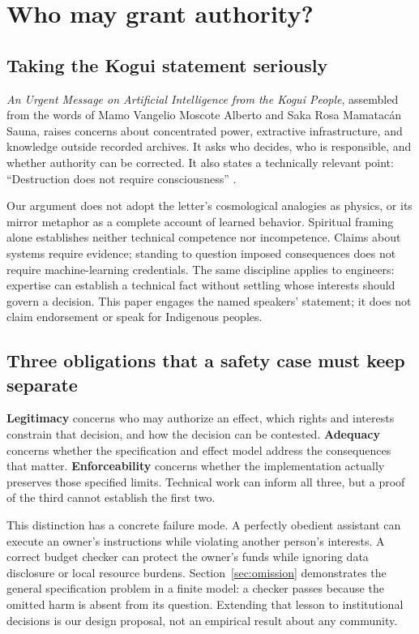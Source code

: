 \section{Who may grant authority?}
\label{sec:legitimacy}

\subsection{Taking the Kogui statement seriously}
\emph{An Urgent Message on Artificial Intelligence from the Kogui People}, assembled from the words of Mamo Vangelio Moscote Alberto and Saka Rosa Mamatac\'an Sauna, raises concerns about concentrated power, extractive infrastructure, and knowledge outside recorded archives. It asks who decides, who is responsible, and whether authority can be corrected. It also states a technically relevant point: ``Destruction does not require consciousness'' \cite[pp.~1--4, 10--14]{kogui}.

Our argument does not adopt the letter's cosmological analogies as physics, or its mirror metaphor as a complete account of learned behavior. Spiritual framing alone establishes neither technical competence nor incompetence. Claims about systems require evidence; standing to question imposed consequences does not require machine-learning credentials. The same discipline applies to engineers: expertise can establish a technical fact without settling whose interests should govern a decision. This paper engages the named speakers' statement; it does not claim endorsement or speak for Indigenous peoples.

\subsection{Three obligations that a safety case must keep separate}
\textbf{Legitimacy} concerns who may authorize an effect, which rights and interests constrain that decision, and how the decision can be contested. \textbf{Adequacy} concerns whether the specification and effect model address the consequences that matter. \textbf{Enforceability} concerns whether the implementation actually preserves those specified limits. Technical work can inform all three, but a proof of the third cannot establish the first two.

This distinction has a concrete failure mode. A perfectly obedient assistant can execute an owner's instructions while violating another person's interests. A correct budget checker can protect the owner's funds while ignoring data disclosure or local resource burdens. Section~\ref{sec:omission} demonstrates the general specification problem in a finite model: a checker passes because the omitted harm is absent from its question. Extending that lesson to institutional decisions is our design proposal, not an empirical result about any community.


